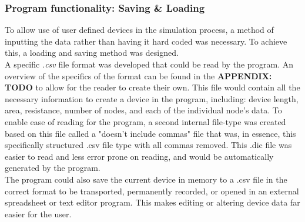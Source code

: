 \documentclass[titlepage]{article}
\begin{document}
\subsubsection{Program functionality: Saving \& Loading}
To allow use of user defined devices in the simulation process, a method of inputting the data rather than having it hard coded was necessary. To achieve this, a loading and saving method was designed.\\
A specific \textit{.csv} file format was developed that could be read by the program. An overview of the specifics of the format can be found in the \textbf{APPENDIX: TODO} to allow for the reader to create their own. This file would contain all the necessary information to create a device in the program, including: device length, area, resistance, number of nodes, and each of the individual node's data. To enable ease of reading for the program, a second internal file-type was created based on this file called a "doesn't include commas" file that was, in essence, this specifically structured .csv file type with all commas removed. This .dic file was easier to read and less error prone on reading, and would be automatically generated by the program.\\
The program could also save the current device in memory to a .csv file in the correct format to be transported, permanently recorded, or opened in an external spreadsheet or text editor program. This makes editing or altering device data far easier for the user.
\end{document}
